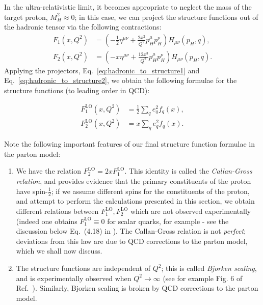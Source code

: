 \documentclass[withindex,glossary]{cam-thesis}
\begin{document}
In the ultra-relativistic limit, it becomes appropriate to neglect the mass of the target proton, $M_H^2 \approx 0$; in this case, we can project the structure functions out of the hadronic tensor via the following contractions:
\begin{align}
\label{eq:hadronic_to_structure1}
F_1(x,Q^2) &=\left( -\frac{1}{2} \eta^{\mu\nu} + \frac{2x^2}{Q^2} p_H^{\mu} p_H^{\nu} \right) H_{\mu\nu} (p_H, q), \\[1.5ex]
\label{eq:hadronic_to_structure2}
F_2(x,Q^2) &= \left( - x \eta^{\mu\nu} + \frac{12x^3}{Q^2} p_H^{\mu} p_H^{\nu} \right) H_{\mu\nu}(p_H, q).
\end{align}
Applying the projectors, Eq.~\eqref{eq:hadronic_to_structure1} and Eq.~\eqref{eq:hadronic_to_structure2}, we obtain the following formulae for the structure functions (to leading order in QCD):
\begin{framed}
\begin{align}
F_1^{\text{LO}}(x,Q^2) &= \frac{1}{2}\sum_{q} e_q^2 f_q(x), \\[1.5ex]
F_2^{\text{LO}}(x,Q^2) &= x \sum_{q} e_q^2 f_q(x).
\end{align}
\end{framed}
Note the following important features of our final structure function formulae in the parton model:
\begin{enumerate}[label = (\arabic*)]
\item We have the relation $F_2^{\text{LO}} = 2x F_1^{\text{LO}}$. This identity is called the \textit{Callan-Gross relation}, and provides evidence that the primary constituents of the proton have spin-$\frac{1}{2}$; if we assume different spins for the constituents of the proton, and attempt to perform the calculations presented in this section, we obtain different relations between $F_1^{\text{LO}}, F_2^{\text{LO}}$ which are not observed experimentally (indeed one obtains $F_1^{\text{LO}}\equiv 0$ for scalar quarks, for example - see the discussion below Eq.~(4.18) in \cite{Ellis:1996mzs}). The Callan-Gross relation is not \textit{perfect}; deviations from this law are due to QCD corrections to the parton model, which we shall now discuss.
\item The structure functions are independent of $Q^2$; this is called \textit{Bjorken scaling}, and is experimentally observed when $Q^2 \rightarrow \infty$ (see for example Fig. 6 of Ref.~\cite{Martin:1994kn}). Similarly, Bjorken scaling is broken by QCD corrections to the parton model.
\end{enumerate}
\end{document}
